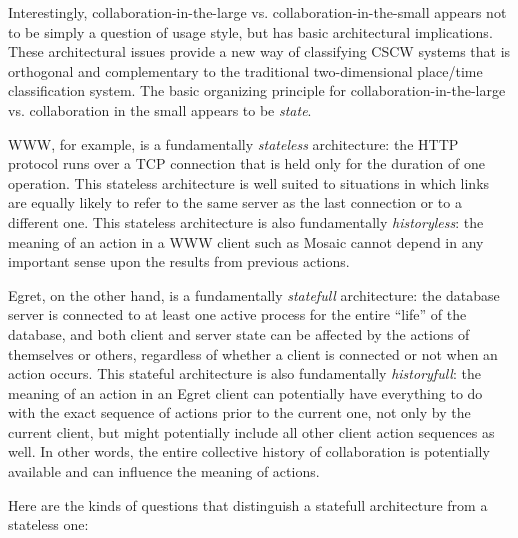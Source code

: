 Interestingly, collaboration-in-the-large vs. collaboration-in-the-small
appears not to be simply a question of usage style, but has basic
architectural implications.  These architectural issues provide a new way
of classifying CSCW systems that is orthogonal and complementary to the
traditional two-dimensional place/time classification system.  The basic
organizing principle for collaboration-in-the-large vs. collaboration in
the small appears to be {\em state}.

WWW, for example, is a fundamentally {\em stateless} architecture: the HTTP
protocol runs over a TCP connection that is held only for the duration of
one operation.  This stateless architecture is well suited to situations in
which links are equally likely to refer to the same server as the last
connection or to a different one. This stateless architecture is also
fundamentally {\em historyless}: the meaning of an action in a WWW client
such as Mosaic cannot depend in any important sense upon the results from
previous actions.  

Egret, on the other hand, is a fundamentally {\em statefull} architecture: 
the database server is connected to at least one active process for the entire
``life'' of the database, and both client and server state can be affected
by the actions of themselves or others, regardless of whether a client is 
connected or not when an action occurs.  This stateful architecture is 
also fundamentally {\em historyfull}: the meaning of an action in an Egret 
client can potentially have everything to do with the exact sequence of 
actions prior to the current one, not only by the current client, but
might potentially include all other client action sequences as well.  In
other words, the entire collective history of collaboration is potentially
available and can influence the meaning of actions. 

Here are the kinds of questions that distinguish a statefull architecture from a
stateless one:

